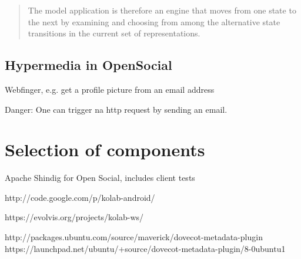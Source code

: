 \documentclass[12pt,a4paper]{scrartcl}		%
\begin{document}



\begin{quotation}
  The model application is therefore an engine that moves from one state to the next by examining and choosing from among the alternative state transitions in the current set of representations.
\end{quotation}\cite[sec. 5.3, p.103]{Fielding2000}

\subsection{Hypermedia in OpenSocial}

Webfinger, e.g. get a profile picture from an email address

Danger: One can trigger na http request by sending an email.

\section{Selection of components}

Apache Shindig for Open Social, includes client tests

http://code.google.com/p/kolab-android/

https://evolvis.org/projects/kolab-ws/

http://packages.ubuntu.com/source/maverick/dovecot-metadata-plugin
https://launchpad.net/ubuntu/+source/dovecot-metadata-plugin/8-0ubuntu1



\end{document}

